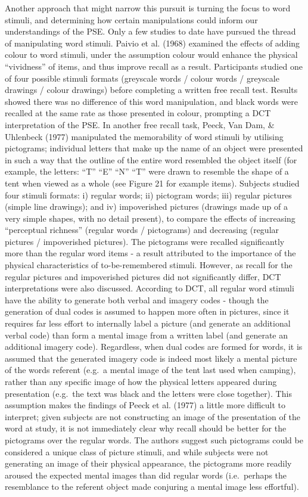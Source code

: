 \documentclass[
  11pt,
]{article}
\begin{document}
Another approach that might narrow this pursuit is turning the focus to
word stimuli, and determining how certain manipulations could inform our
understandings of the PSE. Only a few studies to date have pursued the
thread of manipulating word stimuli. Paivio et al. (1968) examined the
effects of adding colour to word stimuli, under the assumption colour
would enhance the physical ``vividness'' of items, and thus improve
recall as a result. Participants studied one of four possible stimuli
formats (greyscale words / colour words / greyscale drawings / colour
drawings) before completing a written free recall test. Results showed
there was no difference of this word manipulation, and black words were
recalled at the same rate as those presented in colour, prompting a DCT
interpretation of the PSE. In another free recall task, Peeck, Van Dam,
\& Uhlenbeck (1977) manipulated the memorability of word stimuli by
utilising pictograms; individual letters that make up the name of an
object were presented in such a way that the outline of the entire word
resembled the object itself (for example, the letters: ``T'' ``E'' ``N''
``T'' were drawn to resemble the shape of a tent when viewed as a whole
(see Figure 21 for example items). Subjects studied four stimuli
formats: i) regular words; ii) pictogram words; iii) regular pictures
(simple line drawings); and iv) impoverished pictures (drawings made up
of a very simple shapes, with no detail present), to compare the effects
of increasing ``perceptual richness'' (regular words / pictograms) and
decreasing (regular pictures / impoverished pictures). The pictograms
were recalled significantly more than the regular word items - a result
attributed to the importance of the physical characteristics of
to-be-remembered stimuli. However, as recall for the regular pictures
and impoverished pictures did not significantly differ, DCT
interpretations were also discussed. According to DCT, all regular word
stimuli have the ability to generate both verbal and imagery codes -
though the generation of dual codes is assumed to happen more often in
pictures, since it requires far less effort to internally label a
picture (and generate an additional verbal code) than form a mental
image from a written label (and generate an additional imagery code).
Regardless, when dual codes are formed for words, it is assumed that the
generated imagery code is indeed most likely a mental picture of the
words referent (e.g.~a mental image of the tent last used when camping),
rather than any specific image of how the physical letters appeared
during presentation (e.g.~the text was black and the letters were close
together). This assumption makes the findings of Peeck et al. (1977) a
little more difficult to interpret; given subjects are not constructing
an image of the presentation of the word at study, it is not immediately
clear why recall should be better for the pictograms over the regular
words. The authors suggest such pictograms could be considered a unique
class of picture stimuli, and while subjects were not generating an
image of their physical appearance, the pictograms more readily aroused
the expected mental images than did regular words (i.e.~perhaps the
resemblance to the referent object made conjuring a mental image less
effortful).
\end{document}
